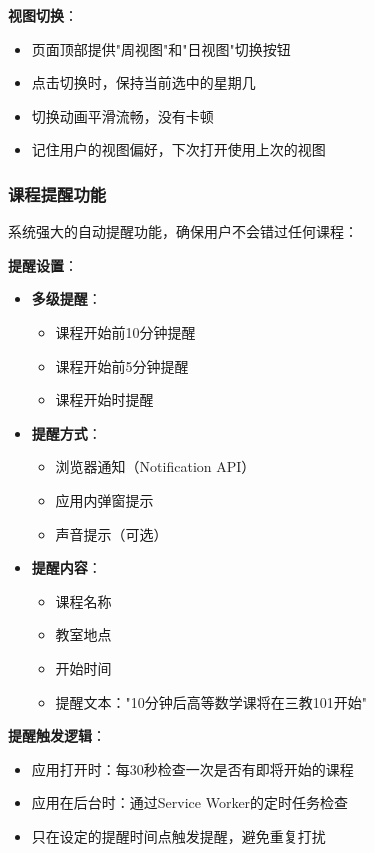 \documentclass[12pt,a4paper]{article}
\begin{document}
\textbf{视图切换}：
\begin{itemize}
    \item 页面顶部提供"周视图"和"日视图"切换按钮
    \item 点击切换时，保持当前选中的星期几
    \item 切换动画平滑流畅，没有卡顿
    \item 记住用户的视图偏好，下次打开使用上次的视图
\end{itemize}

\subsubsection{课程提醒功能}

系统强大的自动提醒功能，确保用户不会错过任何课程：

\textbf{提醒设置}：
\begin{itemize}
    \item \textbf{多级提醒}：
        \begin{itemize}
            \item 课程开始前10分钟提醒
            \item 课程开始前5分钟提醒
            \item 课程开始时提醒
        \end{itemize}
    \item \textbf{提醒方式}：
        \begin{itemize}
            \item 浏览器通知（Notification API）
            \item 应用内弹窗提示
            \item 声音提示（可选）
        \end{itemize}
    \item \textbf{提醒内容}：
        \begin{itemize}
            \item 课程名称
            \item 教室地点
            \item 开始时间
            \item 提醒文本："10分钟后高等数学课将在三教101开始"
        \end{itemize}
\end{itemize}

\textbf{提醒触发逻辑}：
\begin{itemize}
    \item 应用打开时：每30秒检查一次是否有即将开始的课程
    \item 应用在后台时：通过Service Worker的定时任务检查
    \item 只在设定的提醒时间点触发提醒，避免重复打扰
\end{itemize}
\end{document}
